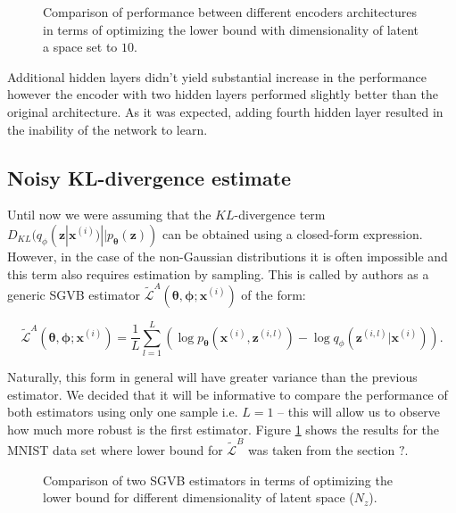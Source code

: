 \documentclass[../report.tex]{subfiles}
\begin{document}
\begin{figure}[!htb]
\centering

  \caption[1]{Comparison of performance between different encoders architectures in terms of optimizing the lower bound with dimensionality of latent a space set to $10$. }
\end{figure}

Additional hidden layers didn't yield substantial increase in the performance however the encoder with two hidden layers performed slightly better than the original architecture. As it was expected, adding fourth hidden layer resulted in the inability of the network to learn.

\subsection{Noisy KL-divergence estimate}
Until now we were assuming that the $KL$-divergence term $D_{KL} (q_{\phi}(\mathbf{z} | \mathbf{x}^{(i)}) || p_{\boldsymbol{\theta}}( \mathbf{z}) ) $ can be obtained using a closed-form expression. However, in the case of the non-Gaussian distributions it is often impossible and this term also requires estimation by sampling. This is called by authors as a generic SGVB estimator $\widetilde{\mathcal{L}}^{A}(\boldsymbol{\theta}, \boldsymbol{\phi}; \mathbf{x}^{(i)})$ of the form:

$$ \widetilde{\mathcal{L}}^{A}(\boldsymbol{\theta}, \boldsymbol{\phi}; \mathbf{x}^{(i)}) = \frac{1}{L} \sum_{l=1}^L \left( \log p_{\boldsymbol{\theta}}(\mathbf{x}^{(i)}, \mathbf{z}^{(i,l)}) - \log q_{\phi}(\mathbf{z}^{(i,l)} | \mathbf{x}^{(i)}) \right).$$

Naturally, this form in general will have greater variance than the previous estimator. We decided that it will be informative to compare the performance of both estimators using only one sample i.e. $L=1$ -- this will allow us to observe how much more robust is the first estimator. Figure \ref{fig:mnist_LAvsLB} shows the results for the MNIST data set where lower bound for $\widetilde{\mathcal{L}}^{B}$ was taken from the section $?$.

\begin{figure}[!htb]
\centering

  \caption[1]{Comparison of two SGVB estimators in terms of optimizing the lower bound for different dimensionality of latent space ($N_z$). }
  \label{fig:mnist_LAvsLB}
\end{figure}
\end{document}
